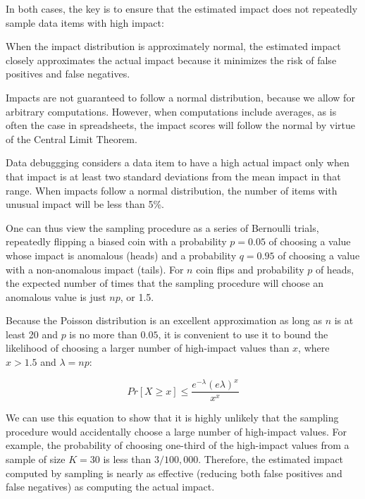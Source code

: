 In both cases, the key is to ensure that the estimated impact does not
repeatedly sample data items with high impact:

\begin{theorem}
When the impact distribution is approximately normal, the estimated impact closely approximates the actual impact because it minimizes the risk of false positives and false negatives.
\end{theorem}

Impacts are not guaranteed to follow a normal distribution, because we
allow for arbitrary computations.  However, when computations include
averages, as is often the case in spreadsheets, the impact scores will
follow the normal by virtue of the Central Limit Theorem.

Data debuggging considers a data item to have a high actual impact
only when that impact is at least two standard deviations from the
mean impact in that range. When impacts follow a normal distribution,
the number of items with unusual impact will be less than 5\%.

One can thus view the sampling procedure as a series of Bernoulli
trials, repeatedly flipping a biased coin with a probability $p =
0.05$ of choosing a value whose impact is anomalous (heads) and a
probability $q = 0.95$ of choosing a value with a non-anomalous impact
(tails). For $n$ coin flips and probability $p$ of heads, the expected
number of times that the sampling procedure will choose an anomalous
value is just $np$, or 1.5.

Because the Poisson distribution is an excellent approximation as long
as $n$ is at least 20 and $p$ is no more than $0.05$, it is convenient
to use it to bound the likelihood of choosing a larger number of
high-impact values than $x$, where $x > 1.5$ and $\lambda = np$:

\begin{equation}
Pr[X \geq x] \leq \frac{e^{-\lambda}(e \lambda)^x}{x^x}
\end{equation}

We can use this equation to show that it is highly unlikely that the
sampling procedure would accidentally choose a large number of
high-impact values. For example, the probability of choosing one-third
of the high-impact values from a sample of size $K = 30$ is less than
$3/100,000$. Therefore, the estimated impact computed by sampling is
nearly as effective (reducing both false positives and false
negatives) as computing the actual impact.

